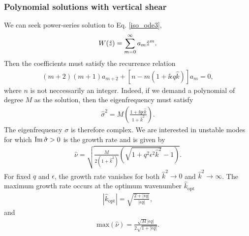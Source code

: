 \subsubsection{Polynomial solutions with vertical shear}
We can seek power-series solution to Eq. \ref{iso_ode3},
\begin{align}
  W(\hat{z}) = \sum_{m=0}^\infty a_m\hat{z}^m. 
\end{align}
Then the coefficients must satisfy the recurrence relation
\begin{align}
  (m+2)(m+1)a_{m+2} +
  \left[n - m\left(1+\ii \epsilon q  \hat{k}\right)\right] a_m = 0, 
\end{align}
where $n$ is not neccessarily an integer. Indeed, if we demand
a polynomial of degree $M$ as the solution, then the eigenfrequency
must satisfy
\begin{align}
\hat{\sigma}^2 = M\left(\frac{1+\ii q \epsilon
    \hat{k}}{1+\hat{k}^2}\right).
\end{align}
The eigenfrequency $\sigma$ is therefore complex. We are interested in
unstable modes for which $\operatorname{Im}{\hat{\sigma}}>0$ is the growth rate and is
given by 
\begin{align}\label{simple_growth}
  \hat{\nu} =\sqrt{
   \frac{M}{2\left(1+\hat{k}^2\right)}\left(\sqrt{1+q^2\epsilon^2\hat{k}^2} - 
    1\right)}. 
\end{align}
For fixed $q$ and $\epsilon$, the growth rate vanishes for both
$\hat{k}^2\to0$ and $\hat{k}^2\to\infty$. The maximum growth rate
occurs at the optimum wavenumber $\hat{k}_\mathrm{opt}$
\begin{align}
  |\hat{k}_\mathrm{opt}| = \sqrt{\frac{2+|\epsilon q|}{|\epsilon q|}},
\end{align}
and
\begin{align}
\mathrm{max}\left(\hat{\nu}\right) =\frac{\sqrt{M}|\epsilon
  q|}{2\sqrt{1+|\epsilon q|}}. \label{iso_max_growth}
\end{align}



